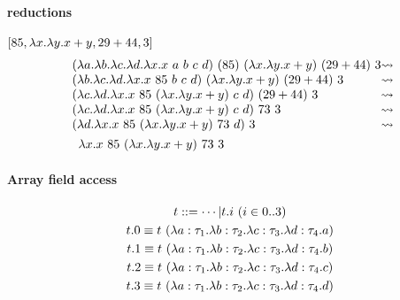 \documentclass{article}
\newcommand{\lam}[2]{\ensuremath{\lambda#1.#2}}
\begin{document}
\paragraph{reductions} $[85, \lam{x}\lam{y}{x+y}, 29+44, 3]$
\begin{align*}
    &\begin{array}{l @{\leadsto}l}
        (\lam{a}\lam{b}\lam{c}\lam{d}\lam{x}{x\ a\ b\ c\ d})\ (85)\ (\lam{x}\lam{y}{x+y})\ (29+44)\ 3 \\
        (\lam{b}\lam{c}\lam{d}\lam{x}{x\ 85\ b\ c\ d})\ (\lam{x}\lam{y}{x+y})\ (29+44)\ 3 \\
        (\lam{c}\lam{d}\lam{x}{x\ 85\ (\lam{x}\lam{y}{x+y})\ c\ d})\ (29+44)\ 3 \\
        (\lam{c}\lam{d}\lam{x}{x\ 85\ (\lam{x}\lam{y}{x+y})\ c\ d})\ 73\ 3 \\
        (\lam{d}\lam{x}{x\ 85\ (\lam{x}\lam{y}{x+y})\ 73\ d})\ 3 \\
    \end{array} \\
        &\quad\lam{x}{x\ 85\ (\lam{x}\lam{y}{x+y})\ 73\ 3}
\end{align*}

\paragraph{Array field access}
\begin{gather*}
    t ::= \cdots | t.i\ (i\in0..3) \\
    t.0 \equiv t\ (\lam{a:\tau_1}\lam{b:\tau_2}\lam{c:\tau_3}\lam{d:\tau_4}{a}) \\
    t.1 \equiv t\ (\lam{a:\tau_1}\lam{b:\tau_2}\lam{c:\tau_3}\lam{d:\tau_4}{b}) \\
    t.2 \equiv t\ (\lam{a:\tau_1}\lam{b:\tau_2}\lam{c:\tau_3}\lam{d:\tau_4}{c}) \\
    t.3 \equiv t\ (\lam{a:\tau_1}\lam{b:\tau_2}\lam{c:\tau_3}\lam{d:\tau_4}{d}) \\
\end{gather*}
\end{document}
